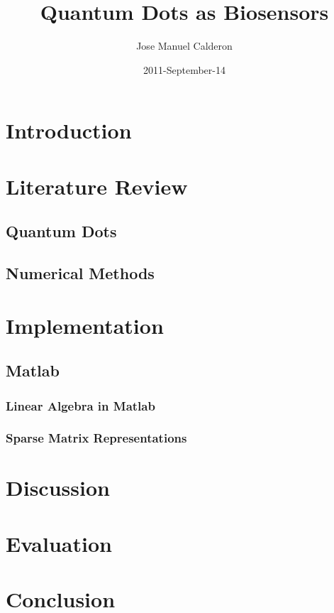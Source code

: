 \documentclass[authoryearcitations]{UoYCSproject}
\author{Jose Manuel Calderon}
\title{Quantum Dots as Biosensors}
\date{2011-September-14}
\begin{document}
 
\maketitle
\chapter{Introduction}

\chapter{Literature Review}

\section{Quantum Dots}

\section{Numerical Methods}

\chapter{Implementation}
\section{Matlab}

\subsection{Linear Algebra in Matlab}



\subsection{Sparse Matrix Representations}


\chapter{Discussion}

\chapter{Evaluation}

\chapter{Conclusion}
\end{document}
